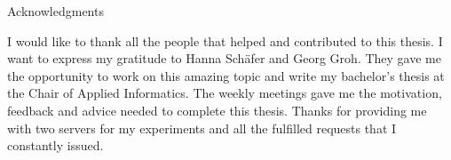 \thispagestyle{empty}

\vspace*{2cm}

\begin{center}
{ Acknowledgments}
\end{center}

\vspace{1cm}

I would like to thank all the people that helped and contributed to this thesis. I want to express my gratitude to Hanna Schäfer and Georg Groh. They gave me the opportunity to work on this amazing topic and write my bachelor's thesis at the Chair of Applied Informatics. The weekly meetings gave me the motivation, feedback and advice needed to complete this thesis. Thanks for providing me with two servers for my experiments and all the fulfilled requests that I constantly issued. 

\cleardoublepage{}
